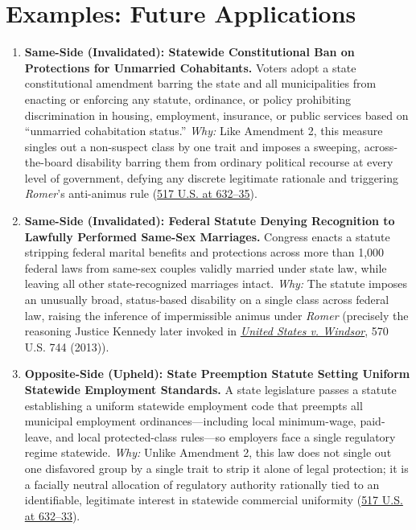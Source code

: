 \documentclass[12pt]{article}
\begin{document}
\section{Examples: Future Applications}

\begin{enumerate}
\item \textbf{Same-Side (Invalidated): Statewide Constitutional Ban on Protections for Unmarried Cohabitants.} Voters adopt a state constitutional amendment barring the state and all municipalities from enacting or enforcing any statute, ordinance, or policy prohibiting discrimination in housing, employment, insurance, or public services based on ``unmarried cohabitation status.'' \textit{Why:} Like Amendment 2, this measure singles out a non-suspect class by one trait and imposes a sweeping, across-the-board disability barring them from ordinary political recourse at every level of government, defying any discrete legitimate rationale and triggering \textit{Romer}'s anti-animus rule (\href{https://supreme.justia.com/cases/federal/us/517/620/}{517 U.S. at 632--35}).
\item \textbf{Same-Side (Invalidated): Federal Statute Denying Recognition to Lawfully Performed Same-Sex Marriages.} Congress enacts a statute stripping federal marital benefits and protections across more than 1,000 federal laws from same-sex couples validly married under state law, while leaving all other state-recognized marriages intact. \textit{Why:} The statute imposes an unusually broad, status-based disability on a single class across federal law, raising the inference of impermissible animus under \textit{Romer} (precisely the reasoning Justice Kennedy later invoked in \href{https://www.law.cornell.edu/constitution-conan/amendment-14/section-1/sexual-orientation}{\textit{United States v. Windsor}}, 570 U.S. 744 (2013)).
\item \textbf{Opposite-Side (Upheld): State Preemption Statute Setting Uniform Statewide Employment Standards.} A state legislature passes a statute establishing a uniform statewide employment code that preempts all municipal employment ordinances---including local minimum-wage, paid-leave, and local protected-class rules---so employers face a single regulatory regime statewide. \textit{Why:} Unlike Amendment 2, this law does not single out one disfavored group by a single trait to strip it alone of legal protection; it is a facially neutral allocation of regulatory authority rationally tied to an identifiable, legitimate interest in statewide commercial uniformity (\href{https://supreme.justia.com/cases/federal/us/517/620/}{517 U.S. at 632--33}).

\end{enumerate}
\end{document}
